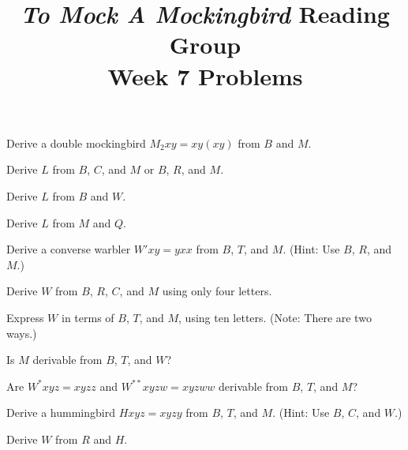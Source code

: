 \documentclass[12pt, letterpaper]{article}
\title{\emph{To Mock A Mockingbird} Reading Group\\Week 7 Problems}
\begin{document}
\maketitle

\disclaimer

\begin{prob}{12.1}   
Derive a double mockingbird $M_2xy = xy(xy)$ from $B$ and $M$.
\end{prob}

\begin{prob}{12.2}   
Derive $L$ from $B$, $C$, and $M$ or $B$, $R$, and $M$.
\end{prob}

\begin{prob}{12.3}   
Derive $L$ from $B$ and $W$.
\end{prob}

\begin{prob}{12.4}   
Derive $L$ from $M$ and $Q$.
\end{prob}

\begin{prob}{12.5}   
Derive a converse warbler $W'xy = yxx$ from $B$, $T$, and $M$. (Hint: Use $B$, $R$, and $M$.)
\end{prob}

\begin{prob}{12.6}   
Derive $W$ from $B$, $R$, $C$, and $M$ using only four letters.
\end{prob}

\begin{prob}{12.7}   
Express $W$ in terms of $B$, $T$, and $M$, using ten letters. (Note: There are two ways.)
\end{prob}

\begin{prob}{12.8}   
Is $M$ derivable from $B$, $T$, and $W$?
\end{prob}

\begin{prob}{12.9}   
Are $W^*xyz = xyzz$ and $W^{**}xyzw = xyzww$ derivable from $B$, $T$, and $M$?
\end{prob}

\begin{prob}{12.10}  
Derive a hummingbird $Hxyz = xyzy$ from $B$, $T$, and $M$. (Hint: Use $B$, $C$, and $W$.)
\end{prob}

\begin{prob}{12.11}  
Derive $W$ from $R$ and $H$.
\end{prob}
\end{document}
